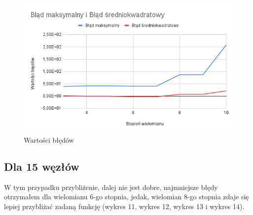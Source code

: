 \documentclass{article}
\begin{document}
\begin{figure}[H]
  \centering
  \begin{minipage}[b]{0.4\textwidth}
    \includegraphics[width=\textwidth]{img10.png}
    \caption{Wartości błędów}
  \end{minipage}
\end{figure}

\newpage

\subsection{Dla 15 węzłów}

W tym przypadku przybliżenie, dalej nie jest dobre, najmniejsze błędy otrzymałem dla wielomianu 6-go stopnia, jedak, wielomian 8-go stopnia zdaje się lepiej przybliżać zadaną funkcję (wykres 11, wykres 12, wykres 13 i wykres 14).
\end{document}
